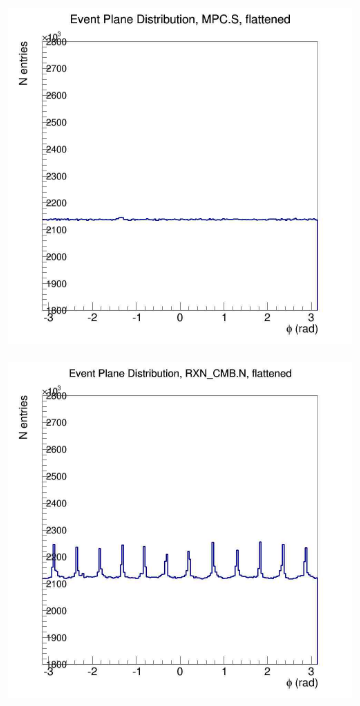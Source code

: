 \begin{figure}[htbp!]
\begin{subfigure}[p]{0.4\textwidth}
    \end{subfigure}
    \begin{subfigure}[p]{0.4\textwidth}
    \includegraphics[width=1\textwidth]{EPflattening/flatmpcs.jpg}
    \end{subfigure}
    \begin{subfigure}[p]{0.4\textwidth}
    \includegraphics[width=1\textwidth]{EPflattening/flatrxncmbn.jpg}

\end{subfigure}
\end{figure}
